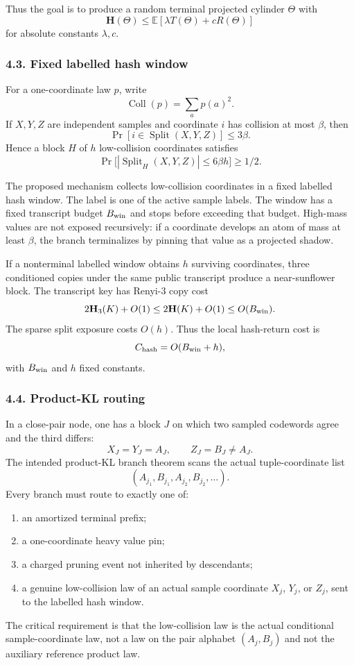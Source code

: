 Thus the goal is to produce a random terminal projected cylinder $\Theta$ with
\[
  \mathbf H(\Theta)
  \le
  \mathbb E[\lambda T(\Theta)+cR(\Theta)]
\]
for absolute constants $\lambda,c$.

\subsubsection*{4.3. Fixed labelled hash window}

For a one-coordinate law $p$, write
\[
  \operatorname{Coll}(p)=\sum_a p(a)^2.
\]
If $X,Y,Z$ are independent samples and coordinate $i$ has collision at most
$\beta$, then
\[
  \Pr[i\in \operatorname{Split}(X,Y,Z)]\le 3\beta.
\]
Hence a block $H$ of $h$ low-collision coordinates satisfies
\[
  \Pr\bigl[|\operatorname{Split}_H(X,Y,Z)|\le 6\beta h\bigr]\ge 1/2.
\]

The proposed mechanism collects low-collision coordinates in a fixed labelled
hash window.  The label is one of the active sample labels.  The window has a
fixed transcript budget $B_{\rm win}$ and stops before exceeding that budget.
High-mass values are not exposed recursively: if a coordinate develops an atom
of mass at least $\beta$, the branch terminalizes by pinning that value as a
projected shadow.

If a nonterminal labelled window obtains $h$ surviving coordinates, three
conditioned copies under the same public transcript produce a near-sunflower
block.  The transcript key has Renyi-3 copy cost
\[
  2\mathbf H_3(K)+O(1)\le 2\mathbf H(K)+O(1)\le O(B_{\rm win}).
\]
The sparse split exposure costs $O(h)$.  Thus the local hash-return cost is
\[
  C_{\rm hash}=O(B_{\rm win}+h),
\]
with $B_{\rm win}$ and $h$ fixed constants.

\subsubsection*{4.4. Product-KL routing}

In a close-pair node, one has a block $J$ on which two sampled codewords agree
and the third differs:
\[
  X_J=Y_J=A_J,\qquad Z_J=B_J\ne A_J .
\]
The intended product-KL branch theorem scans the actual tuple-coordinate list
\[
  (A_{j_1},B_{j_1},A_{j_2},B_{j_2},\ldots).
\]
Every branch must route to exactly one of:
\begin{enumerate}
\item an amortized terminal prefix;
\item a one-coordinate heavy value pin;
\item a charged pruning event not inherited by descendants;
\item a genuine low-collision law of an actual sample coordinate $X_j$, $Y_j$,
or $Z_j$, sent to the labelled hash window.
\end{enumerate}
The critical requirement is that the low-collision law is the actual
conditional sample-coordinate law, not a law on the pair alphabet $(A_j,B_j)$
and not the auxiliary reference product law.

